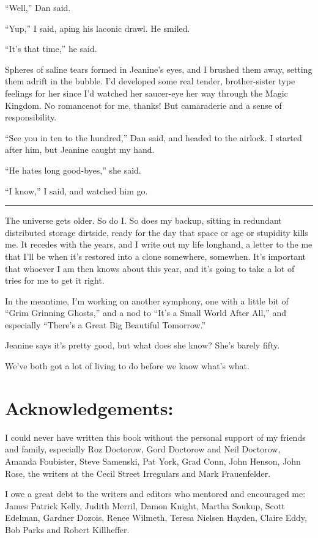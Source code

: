 “Well,” Dan said.

“Yup,” I said, aping his laconic drawl. He smiled.

“It's that time,” he said.

Spheres of saline tears formed in Jeanine's eyes, and I brushed
them away, setting them adrift in the bubble. I'd developed some
real tender, brother-sister type feelings for her since I'd watched
her saucer-eye her way through the Magic Kingdom. No romance{\dash}not
for me, thanks! But camaraderie and a sense of responsibility.

“See you in ten to the hundred,” Dan said, and headed to the
airlock. I started after him, but Jeanine caught my hand.

“He hates long good-byes,” she said.

“I know,” I said, and watched him go.

\begin{center}\rule{1in}{0.4pt}\end{center}

The universe gets older. So do I. So does my backup, sitting in
redundant distributed storage dirtside, ready for the day that
space or age or stupidity kills me. It recedes with the years, and
I write out my life longhand, a letter to the me that I'll be when
it's restored into a clone somewhere, somewhen. It's important that
whoever I am then knows about this year, and it's going to take a
lot of tries for me to get it right.

In the meantime, I'm working on another symphony, one with a little
bit of “Grim Grinning Ghosts,” and a nod to “It's a Small World
After All,” and especially “There's a Great Big Beautiful
Tomorrow.”

Jeanine says it's pretty good, but what does she know? She's barely
fifty.

We've both got a lot of living to do before we know what's what.

\section{Acknowledgements:}

I could never have written this book without the personal support
of my friends and family, especially Roz Doctorow, Gord Doctorow
and Neil Doctorow, Amanda Foubister, Steve Samenski, Pat York, Grad
Conn, John Henson, John Rose, the writers at the Cecil Street
Irregulars and Mark Frauenfelder.

I owe a great debt to the writers and editors who mentored and
encouraged me: James Patrick Kelly, Judith Merril, Damon Knight,
Martha Soukup, Scott Edelman, Gardner Dozois, Renee Wilmeth, Teresa
Nielsen Hayden, Claire Eddy, Bob Parks and Robert Killheffer.

